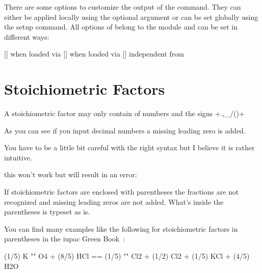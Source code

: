 \documentclass[load-preamble+]{cnltx-doc}
\begin{document}
There are some options to customize the output of the  command.  They
can either be applied locally using the optional argument or can be set
globally using the setup command.  All options of \chemformula{} belong to the
module  and can be set in different ways:
\begin{commands}
  []
    when loaded via \chemmacros
  []
    when loaded via \chemmacros
  []
    independent from \chemmacros
\end{commands}

\section{Stoichiometric Factors}
A stoichiometric factor may only contain of numbers and the signs
\verbcode+.,_/()+
\begin{example}
   \par

  % decimals:
   \par

   \par
 
\end{example}

As you can see if you input decimal numbers a missing leading zero is added.

You have to be a little bit careful with the right syntax but I believe it is
rather intuitive.
\begin{sourcecode}
  this won't work but will result in an error: 
\end{sourcecode}

If stoichiometric factors are enclosed with parentheses the fractions are not
recognized and missing leading zeros are not added.  What's inside the
parentheses is typeset as is.
\begin{example}
    
\end{example}
You can find many examples like the following for stoichiometric factors in
parentheses in the \acs{iupac} Green Book~\cite{iupac:greenbook}:
\begin{reaction*}
 (1/5) K "" O4 + (8/5) HCl == (1/5) "" Cl2 + (1/2) Cl2 + (1/5) KCl + (4/5) H2O
\end{reaction*}
\end{document}
